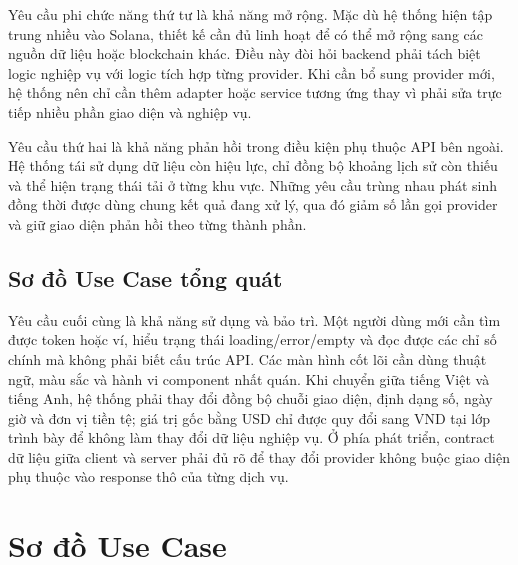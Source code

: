 Yêu cầu phi chức năng thứ tư là khả năng mở rộng. Mặc dù hệ thống hiện tập trung nhiều vào Solana, thiết kế cần đủ linh hoạt để có thể mở rộng sang các nguồn dữ liệu hoặc blockchain khác. Điều này đòi hỏi backend phải tách biệt logic nghiệp vụ với logic tích hợp từng provider. Khi cần bổ sung provider mới, hệ thống nên chỉ cần thêm adapter hoặc service tương ứng thay vì phải sửa trực tiếp nhiều phần giao diện và nghiệp vụ.

Yêu cầu thứ hai là khả năng phản hồi trong điều kiện phụ thuộc API bên ngoài. Hệ thống tái sử dụng dữ liệu còn hiệu lực, chỉ đồng bộ khoảng lịch sử còn thiếu và thể hiện trạng thái tải ở từng khu vực. Những yêu cầu trùng nhau phát sinh đồng thời được dùng chung kết quả đang xử lý, qua đó giảm số lần gọi provider và giữ giao diện phản hồi theo từng thành phần.

\subsection{Sơ đồ Use Case tổng quát}


Yêu cầu cuối cùng là khả năng sử dụng và bảo trì. Một người dùng mới cần tìm được token hoặc ví, hiểu trạng thái loading/error/empty và đọc được các chỉ số chính mà không phải biết cấu trúc API. Các màn hình cốt lõi cần dùng thuật ngữ, màu sắc và hành vi component nhất quán. Khi chuyển giữa tiếng Việt và tiếng Anh, hệ thống phải thay đổi đồng bộ chuỗi giao diện, định dạng số, ngày giờ và đơn vị tiền tệ; giá trị gốc bằng USD chỉ được quy đổi sang VND tại lớp trình bày để không làm thay đổi dữ liệu nghiệp vụ. Ở phía phát triển, contract dữ liệu giữa client và server phải đủ rõ để thay đổi provider không buộc giao diện phụ thuộc vào response thô của từng dịch vụ.

\section{Sơ đồ Use Case}
\label{sec:use_case}

